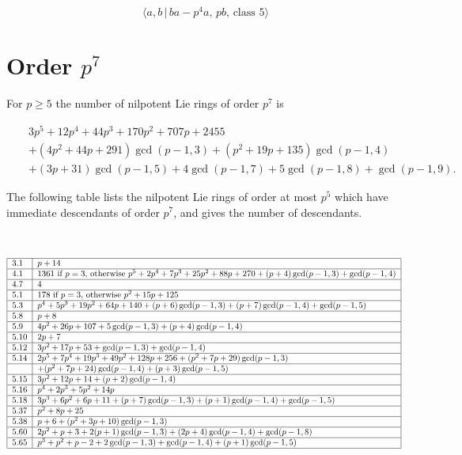 \documentclass[10pt]{article}
\begin{document}
\begin{equation}
\langle a,b\,|\,ba-p^{4}a,\,pb,\,\text{class }5\rangle  \tag{6.519}
\end{equation}

\section{Order $p^{7}$}

For $p\geq 5$ the number of nilpotent Lie rings of order $p^{7}$ is

\begin{eqnarray*}
&&\allowbreak 3p^{5}+12p^{4}+44p^{3}+\allowbreak 170p^{2}+707p+2455 \\
&&+(4p^{2}+44p+291)\gcd (p-1,3)+\allowbreak (p^{2}+19p+135)\gcd (p-1,4) \\
&&+(3p+31)\gcd (p-1,5)+4\gcd (p-1,7)+5\gcd (p-1,8)+\gcd (p-1,9).
\end{eqnarray*}

The following table lists the nilpotent Lie rings of order at most $p^{5}$
which have immediate descendants of order $p^{7}$, and gives the number of
descendants.

{\ }

{\small 
\[
\begin{tabular}{|l|l|}
\hline
3.1 & $p+14$ \\ \hline
4.1 & $1361$ if $p=3$, otherwise $p^{5}+2p^{4}+7p^{3}+25p^{2}+88p+270+(p+4)%
\gcd (p-1,3)+\gcd (p-1,4)$ \\ \hline
4.7 & $4$ \\ \hline
5.1 & $178$ if $p=3$, otherwise $p^{2}+15p+125$ \\ \hline
5.3 & $p^{4}+5p^{3}+19p^{2}+64p+140+(p+6)\gcd (p-1,3)+(p+7)\gcd (p-1,4)+\gcd
(p-1,5)$ \\ \hline
5.8 & $p+8$ \\ \hline
5.9 & $4p^{2}+26p+107+5\gcd (p-1,3)+(p+4)\gcd (p-1,4)$ \\ \hline
5.10 & $2p+7$ \\ \hline
5.12 & $3p^{2}+17p+53+\gcd (p-1,3)+\gcd (p-1,4)$ \\ \hline
5.14 & $2p^{5}+7p^{4}+19p^{3}+49p^{2}+128p+256+(p^{2}+7p+29)\gcd (p-1,3)$ \\ 
\hline
& $+(p^{2}+7p+24)\gcd (p-1,4)+(p+3)\gcd (p-1,5)$ \\ \hline
5.15 & $3p^{2}+12p+14+(p+2)\gcd (p-1,4)$ \\ \hline
5.16 & $p^{4}+2p^{3}+5p^{2}+14p$ \\ \hline
5.18 & $3p^{3}+6p^{2}+6p+11+(p+7)\gcd (p-1,3)+(p+1)\gcd (p-1,4)+\gcd (p-1,5)$
\\ \hline
5.37 & $p^{2}+8p+25$ \\ \hline
5.38 & $p+6+(p^{2}+3p+10)\gcd (p-1,3)$ \\ \hline
5.60 & $2p^{2}+p+3+2(p+1)\gcd (p-1,3)+(2p+4)\gcd (p-1,4)+\gcd (p-1,8)$ \\ 
\hline
5.65 & $p^{3}+p^{2}+p-2+2\gcd (p-1,3)+\gcd (p-1,4)+(p+1)\gcd (p-1,5)$ \\ 
\hline
\end{tabular}%
\ 
\]%
}
\end{document}

